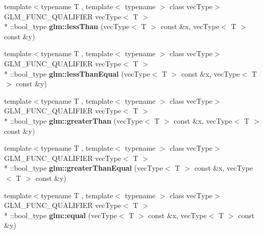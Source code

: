 \begin{DoxyCompactItemize}
\item 
\hypertarget{namespaceglm_a5b27d627ccb73d8240b06f424fd08fd5}{{\footnotesize template$<$typename T , template$<$ typename $>$ class vec\-Type$>$ }\\G\-L\-M\-\_\-\-F\-U\-N\-C\-\_\-\-Q\-U\-A\-L\-I\-F\-I\-E\-R vec\-Type$<$ T $>$\\*
\-::bool\-\_\-type {\bfseries glm\-::less\-Than} (vec\-Type$<$ T $>$ const \&x, vec\-Type$<$ T $>$ const \&y)}\label{namespaceglm_a5b27d627ccb73d8240b06f424fd08fd5}

\item 
\hypertarget{namespaceglm_a92e02a1a011a6f422168c390e51b273e}{{\footnotesize template$<$typename T , template$<$ typename $>$ class vec\-Type$>$ }\\G\-L\-M\-\_\-\-F\-U\-N\-C\-\_\-\-Q\-U\-A\-L\-I\-F\-I\-E\-R vec\-Type$<$ T $>$\\*
\-::bool\-\_\-type {\bfseries glm\-::less\-Than\-Equal} (vec\-Type$<$ T $>$ const \&x, vec\-Type$<$ T $>$ const \&y)}\label{namespaceglm_a92e02a1a011a6f422168c390e51b273e}

\item 
\hypertarget{namespaceglm_acc3192e87d7bb57e9ebb0821b9348de7}{{\footnotesize template$<$typename T , template$<$ typename $>$ class vec\-Type$>$ }\\G\-L\-M\-\_\-\-F\-U\-N\-C\-\_\-\-Q\-U\-A\-L\-I\-F\-I\-E\-R vec\-Type$<$ T $>$\\*
\-::bool\-\_\-type {\bfseries glm\-::greater\-Than} (vec\-Type$<$ T $>$ const \&x, vec\-Type$<$ T $>$ const \&y)}\label{namespaceglm_acc3192e87d7bb57e9ebb0821b9348de7}

\item 
\hypertarget{namespaceglm_a25c709f358e879e9fb7c338614c55d30}{{\footnotesize template$<$typename T , template$<$ typename $>$ class vec\-Type$>$ }\\G\-L\-M\-\_\-\-F\-U\-N\-C\-\_\-\-Q\-U\-A\-L\-I\-F\-I\-E\-R vec\-Type$<$ T $>$\\*
\-::bool\-\_\-type {\bfseries glm\-::greater\-Than\-Equal} (vec\-Type$<$ T $>$ const \&x, vec\-Type$<$ T $>$ const \&y)}\label{namespaceglm_a25c709f358e879e9fb7c338614c55d30}

\item 
\hypertarget{namespaceglm_a8174e161228847c68ded7a51742425e7}{{\footnotesize template$<$typename T , template$<$ typename $>$ class vec\-Type$>$ }\\G\-L\-M\-\_\-\-F\-U\-N\-C\-\_\-\-Q\-U\-A\-L\-I\-F\-I\-E\-R vec\-Type$<$ T $>$\\*
\-::bool\-\_\-type {\bfseries glm\-::equal} (vec\-Type$<$ T $>$ const \&x, vec\-Type$<$ T $>$ const \&y)}\label{namespaceglm_a8174e161228847c68ded7a51742425e7}


\end{DoxyCompactItemize}
